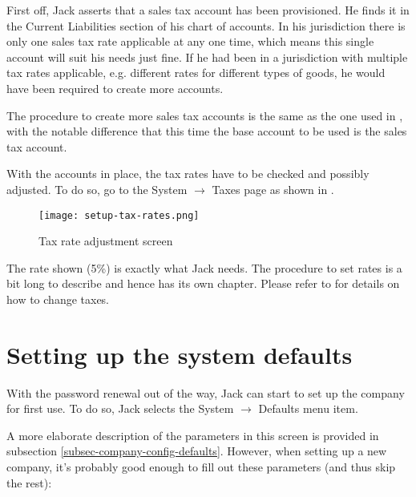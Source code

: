First off, Jack asserts that a sales tax account has been provisioned. He finds it
in the Current Liabilities section of his chart of accounts. In his jurisdiction there
is only one sales tax rate applicable at any one time, which means this single account
will suit his needs just fine. If he had been in a jurisdiction with multiple tax rates
applicable, e.g. different rates for different types of goods, he would have been
required to create more accounts.

The procedure to create more sales tax accounts is the same as the one used in
, with the notable difference that this time the base account
to be used is the sales tax account.

With the accounts in place, the tax rates have to be checked and possibly adjusted.
To do so, go to the System $\rightarrow$ Taxes page as shown in .

\begin{figure}[h]
\texttt{[image: setup-tax-rates.png]}
\caption{Tax rate adjustment screen}
\label{fig:setup-tax-rates}
\end{figure}

The rate shown (5\%) is exactly what Jack needs. The procedure to set rates is a bit
long to describe and hence has its own chapter. Please refer to  for
details on how to change taxes.

\section{Setting up the system defaults}
\label{sec-first-login-defaults}
With the password renewal out of the way, Jack can start to set up the company for first
use. To do so, Jack selects the System $\rightarrow$ Defaults menu item.

A more elaborate description of the parameters in this screen is provided in subsection
\ref{subsec-company-config-defaults}. However, when setting up a new company, it's probably good enough
to fill out these parameters (and thus skip the rest):

